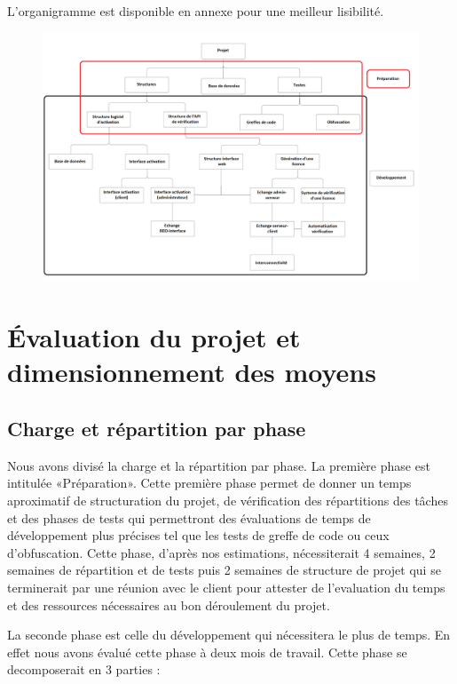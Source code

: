 L'organigramme est disponible en annexe pour une meilleur lisibilité.\newline

\begin{figure}[!h]
    \centering
    \includegraphics[width=18cm]{organi.png}
\end{figure}

\chapter{Évaluation du projet et dimensionnement des moyens}

\section{Charge et répartition par phase}
Nous avons divisé la charge et la répartition par phase. La première phase est intitulée
«Préparation». Cette première phase permet de donner un temps aproximatif de structuration du
projet, de vérification des répartitions des tâches et des phases de tests qui permettront des
évaluations de temps de développement plus précises tel que les tests de greffe de code ou ceux
d'obfuscation. Cette phase, d'après nos estimations, nécessiterait 4 semaines, 2 semaines de
répartition et de tests puis 2 semaines de structure de projet qui se terminerait par une
réunion avec le client pour attester de l'evaluation du temps
et des ressources nécessaires au bon déroulement du projet.\newline
\newline

La seconde phase est celle du développement qui nécessitera le plus de temps. En effet nous avons évalué cette phase à deux mois de travail.
Cette phase se decomposerait en 3 parties : \newline

